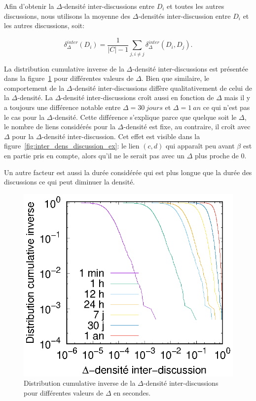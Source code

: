 Afin d'obtenir la $\Delta$-densité inter-discussions entre $D_i$ et toutes les autres discussions, nous utilisons la moyenne des $\Delta$-densités inter-discussion entre $D_i$ et les autres discussions, soit:

\begin{equation}
	\delta^{inter}_{\Delta}(D_i) = \frac{1}{|C|-1}\sum_{j,i\ne j} \delta^{inter}_{\Delta}(D_i,D_j).
\end{equation}

La distribution cumulative inverse de la $\Delta$-densité inter-discussions est présentée dans la figure~\ref{fig:inter_dens_discussion} pour différentes valeurs de $\Delta$.
Bien que similaire, le comportement de la $\Delta$-densité inter-discussions diffère qualitativement de celui de la $\Delta$-densité.
La $\Delta$-densité inter-discussions croît aussi en fonction de $\Delta$ mais il y a toujours une différence notable entre $\Delta= 30\  jours$ et $\Delta= 1\ an$ ce qui n'est pas le cas pour la $\Delta$-densité.
Cette différence s'explique parce que quelque soit le $\Delta$, le nombre de liens considérés pour la $\Delta$-densité est fixe, au contraire, il croît avec $\Delta$ pour la $\Delta$-densité inter-discussion.
Cet effet est visible dans la figure~\ref{fig:inter_dens_discussion_ex}: le lien $(c,d)$ qui apparaît peu avant $\beta$ est en partie pris en compte, alors qu'il ne le serait pas avec un $\Delta$ plus proche de 0.

Un autre facteur est aussi la durée considérée qui est plus longue que la durée des discussions ce qui peut diminuer la densité.
\begin{figure}
\centering
	\includegraphics[width=0.4\linewidth]{img/mailing/inter_delta.eps}
\caption{Distribution cumulative inverse de la $\Delta$-densité inter-discussions pour différentes valeurs de $\Delta$ en secondes.}
\label{fig:inter_dens_discussion}
\end{figure}

\bigskip


